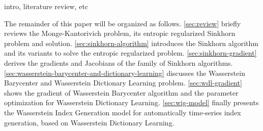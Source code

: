 

intro, literature review, etc

The remainder of this paper will be organized as follows.
\cref{sec:review} briefly reviews the Monge-Kantorivich problem, its entropic regularized Sinkhorn problem and solution.
\cref{sec:sinkhorn-algorithm} introduces the Sinkhorn algorithm and its variants to solve the entropic regularized problem.
\cref{sec:sinkhorn-gradient} derives the gradients and Jacobians of the family of Sinkhorn algorithms.
\cref{sec:wasserstein-barycenter-and-dictionary-learning} discusses the Wasserstein Barycenter and Wasserstein Dictionary Learning
problem.
\cref{sec:wdl-gradient} shows the gradient of Wasserstein Barycenter algorithm and the parameter optimization for Wasserstein Dictionary Learning.
\cref{sec:wig-model} finally presents the Wasserstein Index Generation model for automatically time-series index generation,
based on Wasserstein Dictionary Learning.
